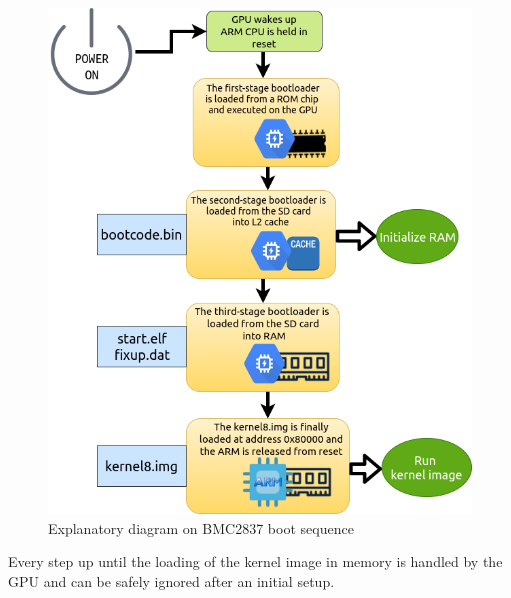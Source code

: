 \documentclass[12pt,a4paper,openright,twoside]{report}
\begin{document}
 \begin{figure}[t]
    \begin{center}
 \includegraphics[scale=0.46]{images/tesi1.png}
 \caption[BCM2837 Boot Sequence]{Explanatory diagram on BMC2837 boot sequence}\label{fig:prima}
\end{center}
 \end{figure}
 \clearpage

Every step up until the loading of the kernel image in memory is handled by 
the GPU and can be safely ignored after an initial setup.
\end{document}
